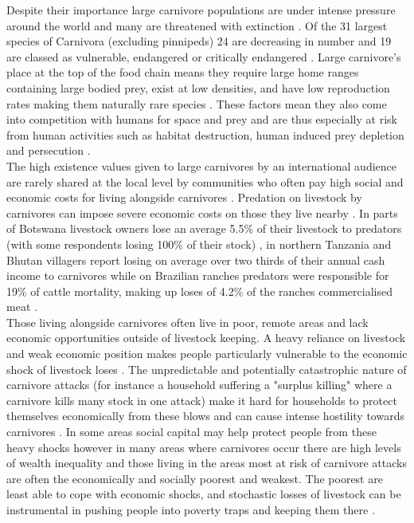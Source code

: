 Despite their importance large carnivore populations are under intense pressure around the world and many are threatened with extinction \cite{ray2013large,Wolf2016,Ripple2014a}. Of the 31 largest species of Carnivora (excluding pinnipeds) 24 are decreasing in number and 19 are classed as vulnerable, endangered or critically endangered \cite{Ripple2014a}. Large carnivore's place at the top of the food chain means they require large home ranges containing large bodied prey, exist at low densities, and have low reproduction rates making them naturally rare species \cite{Ripple2014a}. These factors mean they also come into competition with humans for space and prey and are thus especially at risk from human activities such as habitat destruction, human induced prey depletion and persecution \cite{Woodroffe1998}.\\

The high existence values given to large carnivores by an international audience are rarely shared at the local level by communities who often pay high social and economic costs for living alongside carnivores \cite{Dickman2011,Abade2014h}. Predation on livestock by carnivores can impose severe economic costs on those they live nearby \cite{loveridge2010people}. In parts of Botswana livestock owners lose an average 5.5\% of their livestock to predators (with some respondents losing 100\% of their stock) \cite{Hemson2009b}, in northern Tanzania and Bhutan villagers report losing on average over two thirds of their annual cash income to carnivores \cite{Holmern2007a,Wang2006a} while on Brazilian ranches predators were responsible for 19\% of cattle mortality, making up loses of 4.2\% of the ranches commercialised meat \cite{Palmeira2008}.\\

Those living alongside carnivores often live in poor, remote areas and lack economic opportunities outside of livestock keeping. A heavy reliance on livestock and weak economic position makes people particularly vulnerable to the economic shock of livestock loses \cite{Bagchi2006}. The unpredictable and potentially catastrophic nature of carnivore attacks (for instance a household suffering a "surplus killing" where a carnivore kills many stock in one attack) make it hard for households to protect themselves economically from these blows and can cause intense hostility towards carnivores \cite{Dickman2011,Musiani2005}. In some areas social capital may help protect people from these heavy shocks however in many areas where carnivores occur there are high levels of wealth inequality and those living in the areas most at risk of carnivore attacks are often the economically and socially poorest and weakest. The poorest are least able to cope with economic shocks, and stochastic losses of livestock can be instrumental in pushing people into poverty traps and keeping them there \cite{Lybbert2015}.\\

